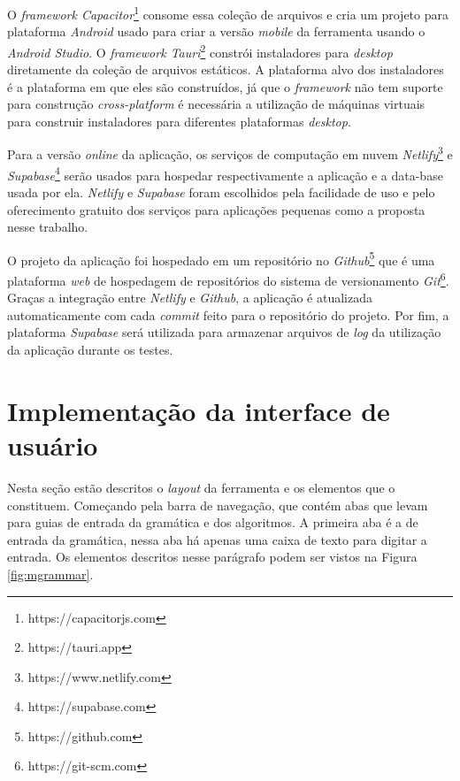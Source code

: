 O \textit{framework Capacitor}\footnote{https://capacitorjs.com} consome essa coleção de arquivos e cria um projeto para plataforma \textit{Android} usado para criar a versão \textit{mobile} da ferramenta usando o \textit{Android Studio}. O \textit{framework Tauri}\footnote{https://tauri.app} constrói instaladores para \textit{desktop} diretamente da coleção de arquivos estáticos. A plataforma alvo dos instaladores é a plataforma em que eles são construídos, já que o \textit{framework} não tem suporte para construção \textit{cross-platform} é necessária a utilização de máquinas virtuais para construir instaladores para diferentes plataformas \textit{desktop}.

Para a versão \textit{online} da aplicação, os serviços  de computação em nuvem \textit{Netlify}\footnote{https://www.netlify.com} e \textit{Supabase}\footnote{https://supabase.com} serão usados para hospedar respectivamente a aplicação e a data-base usada por ela. \textit{Netlify} e \textit{Supabase} foram escolhidos pela facilidade de uso e pelo oferecimento gratuito dos serviços para aplicações pequenas como a proposta nesse trabalho.

O projeto da aplicação foi hospedado em um repositório no \textit{Github}\footnote{https://github.com} que é uma plataforma \textit{web} de hospedagem de repositórios do sistema de versionamento \textit{Git}\footnote{https://git-scm.com}. Graças a integração entre \textit{Netlify} e \textit{Github}, a aplicação é atualizada automaticamente com cada \textit{commit} feito para o repositório do projeto. Por fim, a plataforma \textit{Supabase} será utilizada para armazenar arquivos de \textit{log} da utilização da aplicação durante os testes.

\section{Implementação da interface de usuário}
Nesta seção estão descritos o \textit{layout} da ferramenta e os elementos que o constituem. Começando pela barra de navegação, que contém abas que levam para guias de entrada da gramática e dos algoritmos. A primeira aba é a de entrada da gramática, nessa aba há apenas uma caixa de texto para digitar a entrada. Os elementos descritos nesse parágrafo podem ser vistos na Figura \ref{fig:mgrammar}.

